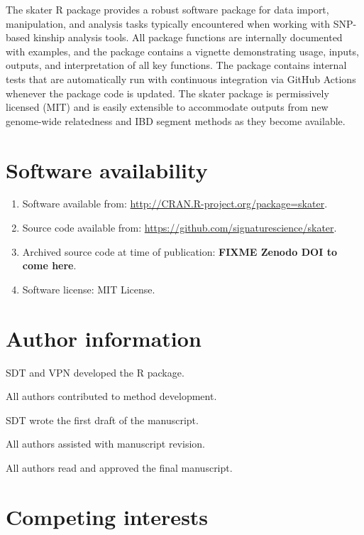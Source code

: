 \documentclass[9pt,a4paper,]{extarticle}
\begin{document}
The skater R package provides a robust software package for data import, manipulation, and analysis tasks typically encountered when working with SNP-based kinship analysis tools. All package functions are internally documented with examples, and the package contains a vignette demonstrating usage, inputs, outputs, and interpretation of all key functions. The package contains internal tests that are automatically run with continuous integration via GitHub Actions whenever the package code is updated. The skater package is permissively licensed (MIT) and is easily extensible to accommodate outputs from new genome-wide relatedness and IBD segment methods as they become available.

\hypertarget{software-availability}{%
\section{Software availability}\label{software-availability}}

\begin{enumerate}
\def\labelenumi{\arabic{enumi}.}
\item
  Software available from: \url{http://CRAN.R-project.org/package=skater}.
\item
  Source code available from: \url{https://github.com/signaturescience/skater}.
\item
  Archived source code at time of publication: \textbf{FIXME Zenodo DOI to come here}.
\item
  Software license: MIT License.
\end{enumerate}

\hypertarget{author-information}{%
\section{Author information}\label{author-information}}

SDT and VPN developed the R package.

All authors contributed to method development.

SDT wrote the first draft of the manuscript.

All authors assisted with manuscript revision.

All authors read and approved the final manuscript.

\hypertarget{competing-interests}{%
\section{Competing interests}\label{competing-interests}}
\end{document}
